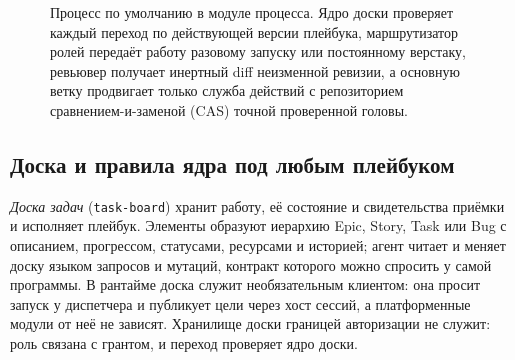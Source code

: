 \documentclass[10pt,a4paper]{article}
\begin{document}
\begin{figure}[t]
\centering
{}
\caption{Процесс по умолчанию в модуле процесса. Ядро доски проверяет каждый переход по действующей версии плейбука, маршрутизатор ролей передаёт работу разовому запуску или постоянному верстаку, ревьювер получает инертный diff неизменной ревизии, а основную ветку продвигает только служба действий с репозиторием сравнением-и-заменой (CAS) точной проверенной головы.}
\label{fig:workflow}
\end{figure}

\subsection{Доска и правила ядра под любым плейбуком}
\label{sec:board}

\emph{Доска задач} (\texttt{task-board}) хранит работу, её состояние и свидетельства приёмки и исполняет плейбук. Элементы образуют иерархию Epic, Story, Task или Bug с описанием, прогрессом, статусами, ресурсами и историей; агент читает и меняет доску языком запросов и мутаций, контракт которого можно спросить у самой программы. В рантайме доска служит необязательным клиентом: она просит запуск у диспетчера и публикует цели через хост сессий, а платформенные модули от неё не зависят. Хранилище доски границей авторизации не служит: роль связана с грантом, и переход проверяет ядро доски.
\end{document}
